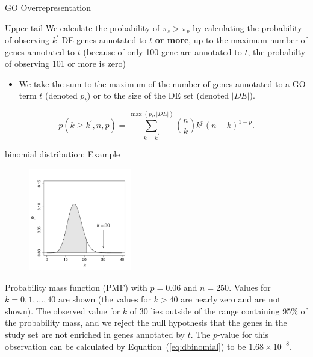 \documentclass{beamer}
\begin{document}
\begin{frame}{GO Overrepresentation }
\begin{mybluebox}{Upper tail}
We calculate the probability of $\pi_{s}>\pi_p $ by calculating the probability of observing $k^{'}$ DE genes annotated to $t$ {\bf or more}, up to the maximum number of genes annotated to $t$ (because of only 100 gene are annotated to $t$, the probabilty of observing 101 or more is zero)
\end{mybluebox}

\begin{itemize}
\item  We take the sum to the maximum of the
number of genes annotated to a GO term $t$ (denoted $p_t$) or to the
size of the DE set (denoted $|\textit{DE}|$). 
\end{itemize}



\begin{equation}
 \label{eq:tailsumdbinomial}
p(k \geq k^{'},n,p) = \sum_{k=k^{'}}^{\max(p_t,|\textit{DE}|)}\binom{n}{k} 
k^p\left(n-k\right)^{1-p}.
\end{equation}  
 
 
\end{frame}

\begin{frame}{binomial distribution: Example}
 \begin{figure}[h!]
 \centering
 \includegraphics[width=0.4\textwidth]{img/Gobinom.pdf}
\end{figure}
\begin{scriptsize}Probability mass function (PMF)  with $p=0.06$ and
   $n=250$. Values for $k=0,1,\ldots,40$ are shown (the values for
   $k>40$ are nearly zero and are not shown). The observed value for
   $k$ of 30 lies outside of the range containing 95\% of the
   probability mass, and we reject the null hypothesis that the genes
   in the study set are not enriched in genes annotated by $t$. The
   $p$-value for this observation can be calculated by
   Equation~(\ref{eq:dbinomial}) to be $1.68\times 10^{-8}$.\end{scriptsize}
 
\end{frame}
\end{document}
